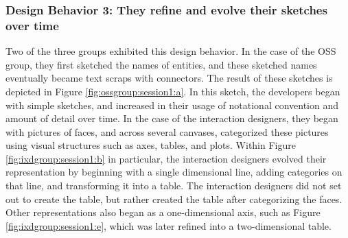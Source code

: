 %
%
%
%
%
%
%
%

\subsubsection{Design Behavior 3: They refine and evolve their sketches over time}

Two of the three groups exhibited this design behavior. In the case of the OSS group, they first sketched the names of entities, and these sketched names eventually became text scraps with connectors. The result of these sketches is depicted in Figure \ref{fig:ossgroup:session1:a}. In this sketch, the developers began with simple sketches, and increased in their usage of notational convention and amount of detail over time. In the case of the interaction designers, they began with pictures of faces, and across several canvases, categorized these pictures using visual structures such as axes, tables, and plots. Within Figure \ref{fig:ixdgroup:session1:b} in particular, the interaction designers evolved their representation by beginning with a single dimensional line, adding categories on that line, and transforming it into a table. The interaction designers did not set out to create the table, but rather created the table after categorizing the faces. Other representations also began as a one-dimensional axis, such as Figure \ref{fig:ixdgroup:session1:e}, which was later refined into a two-dimensional table.

